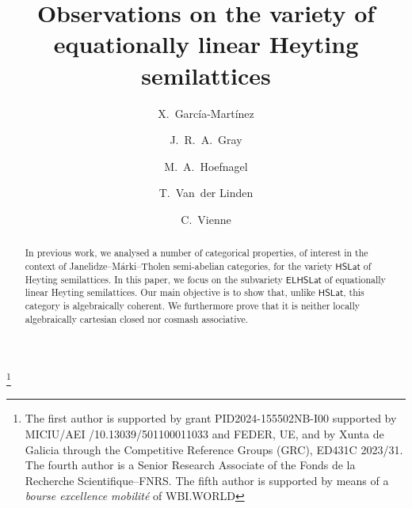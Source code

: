 \documentclass[reqno,a4paper]{amsart}
\theoremstyle{remark}
\theoremstyle{definition}
\newcommand{\HSLat}{\ensuremath{\mathsf{HSLat}}}
\newcommand{\ELHSLat}{\ensuremath{\mathsf{ELHSLat}}}
\begin{document}
\title[Observations on \(\ELHSLat\)]{Observations on the variety of\\ equationally linear Heyting semilattices}
\author[García-Martínez]{X.~García-Martínez}
\author[Gray]{J.~R.~A.~Gray}
\author[Hoefnagel]{M.~A.~Hoefnagel}
\author[Van~der Linden]{T.~Van~der Linden}
\author[Vienne]{C.~Vienne}

\address[Xabier García-Martínez]{CITMAga \& Universidade de Santiago de Compostela, Departamento de Mate\-máticas, R\'ua Lope G\'omez de Marzoa s/n, 15782 Santiago de Compostela, Spain}
\address[James R.\ A.\ Gray, Michael A.\ Hoefnagel]{Mathematics Division, Department of Mathematical Sciences, Stellenbosch University, Private Bag X1, 7602 Matieland, South Africa}
\address[Tim Van~der Linden, Corentin Vienne]{Institut de
	Recherche en Math\'ematique et Physique, Universit\'e catholique
	de Louvain, che\-min du cyclotron~2 bte~L7.01.02, B--1348
	Louvain-la-Neuve, Belgium}
\address[Tim Van der Linden]{Mathematics \& Data Science, Vrije Universiteit Brussel, Pleinlaan 2, B--1050 Brussel, Belgium}
\address[Corentin Vienne]{Dipartimento di Matematica ``Federigo Enriques'', Universit\`a degli Studi di Milano, Via Saldini 50, 20133 Milano, Italy}

\thanks{The first author is supported by grant PID2024-155502NB-I00 supported by MICIU/AEI /10.13039/501100011033 and FEDER, UE, and by Xunta de Galicia through the Competitive Reference Groups (GRC), ED431C	2023/31. The fourth author is a Senior Research Associate of the Fonds de la Recherche Scientifique--FNRS. The fifth author is supported by means of a \emph{bourse excellence mobilité} of WBI.WORLD}

\begin{abstract}
	In previous work, we analysed a number of categorical properties, of interest in the context of Janelidze--Márki--Tholen semi-abelian categories, for the variety \(\HSLat\) of Heyting semilattices. In this paper, we focus on the subvariety \(\ELHSLat\) of equationally linear Heyting semilattices. Our main objective is to show that, unlike \(\HSLat\), this category is algebraically coherent. We furthermore prove that it is neither locally algebraically cartesian closed nor cosmash associative.
\end{abstract}

\end{document}
